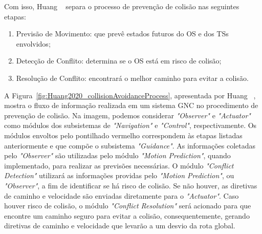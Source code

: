         Com isso, Huang \etal~\cite{HUANG2020451} separa o processo de prevenção de colisão nas seguintes etapas: 
        
        \begin{enumerate}
            \item Previsão de Movimento: que prevê estados futuros do OS e dos TSs envolvidos;
            \item Detecção de Conflito: determina se o OS está em risco de colisão;
            \item Resolução de Conflito: encontrará o melhor caminho para evitar a colisão.
        \end{enumerate}
        
        A Figura~\ref{fig:Huang2020_collisionAvoidanceProcess}, apresentada por Huang \etal~\cite{HUANG2020451}, mostra o fluxo de informação realizada em um sistema GNC no procedimento de prevenção de colisão. Na imagem, podemos considerar \textit{"Observer"} e \textit{"Actuator"} como módulos dos subsistemas de \textit{"Navigation"} e \textit{"Control"}, respectivamente. Os módulos envoltos pelo pontilhado vermelho correspondem às etapas listadas anteriormente e que compõe o subsistema \textit{"Guidance"}. As informações coletadas pelo \textit{"Observer"} são utilizadas pelo módulo \textit{"Motion Prediction"}, quando implementado, para realizar as previsões necessárias. O módulo \textit{"Conflict Detection"} utilizará as informações providas pelo \textit{"Motion Prediction"}, ou \textit{"Observer"}, a fim de identificar se há risco de colisão. Se não houver, as diretivas de caminho e velocidade são enviadas diretamente para o \textit{"Actuator"}. Caso houver risco de colisão, o módulo \textit{"Conflict Resolution"} será acionado para que encontre um caminho seguro para evitar a colisão, consequentemente, gerando diretivas de caminho e velocidade que levarão a um desvio da rota global.
        
